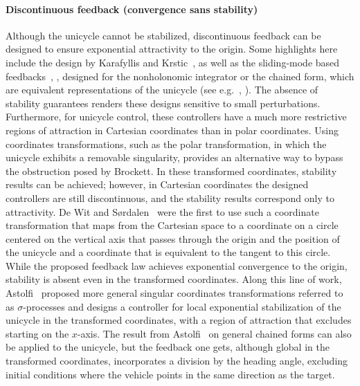 \documentclass[journal,twoside,web]{ieeecolor}
\theoremstyle{definition}
\begin{document}
\paragraph{Discontinuous feedback (convergence sans stability)} 
Although the unicycle cannot be stabilized, discontinuous feedback can be designed to ensure exponential attractivity to the origin.
Some highlights here include the design by Karafyllis and Krstic~\cite{karafyllis2011nonlinear}, as well as the sliding-mode based feedbacks~\cite{bloch1996stabilization_slidingmode}, \cite{astolfi1998discontinuous}, \cite{khennouf1995construction} designed for the nonholonomic integrator or the chained form, which are equivalent representations of the unicycle (see e.g.~\cite{hespanha1999logic}, \cite{murray_chained_form}).
The absence of stability guarantees renders these designs sensitive to small perturbations. 
Furthermore, for unicycle control, these controllers have a much more restrictive regions of attraction in Cartesian coordinates than in polar coordinates.
Using coordinates transformations, such as the polar transformation, in which the unicycle exhibits a removable singularity, provides an alternative way to bypass the obstruction posed by Brockett. In these transformed coordinates, stability results can be achieved; however, in Cartesian coordinates the designed controllers are still discontinuous, and the stability results correspond only to attractivity.  De Wit and S{\o}rdalen~\cite{de1991exponential} were the first to use such a coordinate transformation that maps from the Cartesian space to a coordinate on a circle centered on the vertical axis that passes through the origin and the position of the unicycle and a coordinate that is equivalent to the tangent to this circle. While the proposed feedback law achieves exponential convergence to the origin, stability is absent even in the transformed coordinates. 
Along this line of work, Astolfi~\cite{astolfi1995exponential,astolfi1996discontinuous} proposed more general singular coordinates transformations referred to as $\sigma$-processes and designs a controller for local exponential stabilization of the unicycle in the transformed coordinates, with a region of attraction that excludes starting on the $x$-axis. The result from Astolfi~\cite{astolfi1996discontinuous} on general chained forms can also be applied to the unicycle, but the feedback one gets, although global in the transformed coordinates, incorporates a division by the heading angle, excluding  initial conditions where the vehicle points in the same direction as the target. 
\end{document}
